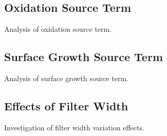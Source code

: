\subsection{Oxidation Source Term}
\label{sec:subfilter:dns:ox}

Analysis of oxidation source term.


\subsection{Surface Growth Source Term}
\label{sec:subfilter:dns:sg}

Analysis of surface growth source term.


\subsection{Effects of Filter Width}
\label{sec:subfilter:dns:fw}

Investigation of filter width variation effects.


